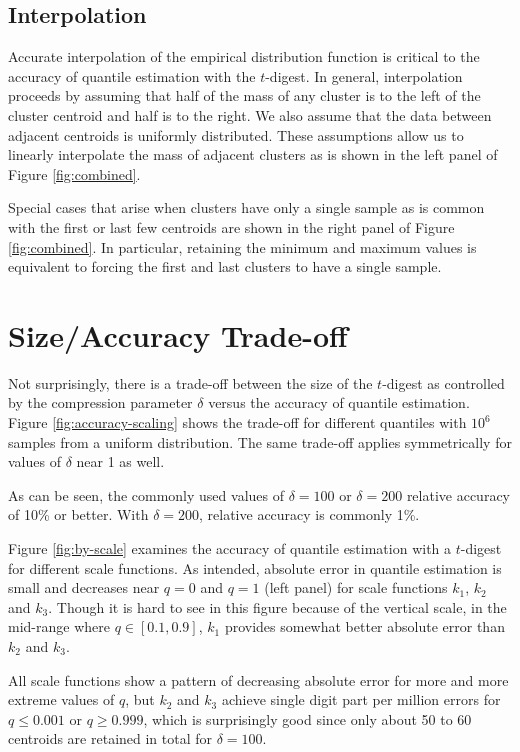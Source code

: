 \documentclass{vldb}
\begin{document}
\subsection{Interpolation}
Accurate interpolation of the empirical distribution function is critical to the accuracy of quantile estimation with the $t$-digest. In general, interpolation proceeds by assuming that half of the mass of any cluster is to the left of the cluster centroid and half is to the right. We also assume that the data between adjacent centroids is uniformly distributed. These assumptions allow us to linearly interpolate the mass of adjacent clusters as is shown in the left panel of Figure \ref{fig:combined}. 

Special cases that arise when clusters have only a single sample as is common with the first or last few centroids are shown in the right panel of Figure \ref{fig:combined}. In particular, retaining the minimum and maximum values is equivalent to forcing the first and last clusters to have a single sample.


\section{Size/Accuracy Trade-off}
Not surprisingly, there is a trade-off between the size of the $t$-digest as controlled by the compression parameter $\delta$ versus the accuracy of quantile estimation.  Figure \ref{fig:accuracy-scaling} shows the trade-off for different quantiles with $10^6$ samples from a uniform distribution. The same trade-off applies symmetrically for values of $\delta$ near 1 as well.

As can be seen, the commonly used values of $\delta=100$ or  $\delta=200$ relative accuracy of 10\% or better. With $\delta=200$, relative accuracy is commonly 1\%.

Figure \ref{fig:by-scale} examines the accuracy of quantile estimation with a $t$-digest for different scale functions.  As intended, absolute error in quantile estimation is small and decreases near $q=0$ and $q=1$ (left panel) for scale functions $k_1$, $k_2$ and $k_3$. Though it is hard to see in this figure because of the vertical scale, in the mid-range where $q \in [0.1, 0.9]$, $k_1$ provides somewhat better absolute error than $k_2$ and $k_3$. 


All scale functions show a pattern of decreasing absolute error for more and more extreme values of $q$, but $k_2$ and $k_3$ achieve single digit part per million errors for $q\le 0.001$ or $q\ge0.999$, which is surprisingly good since only about 50 to 60 centroids are retained in total for $\delta=100$. 
\end{document}
